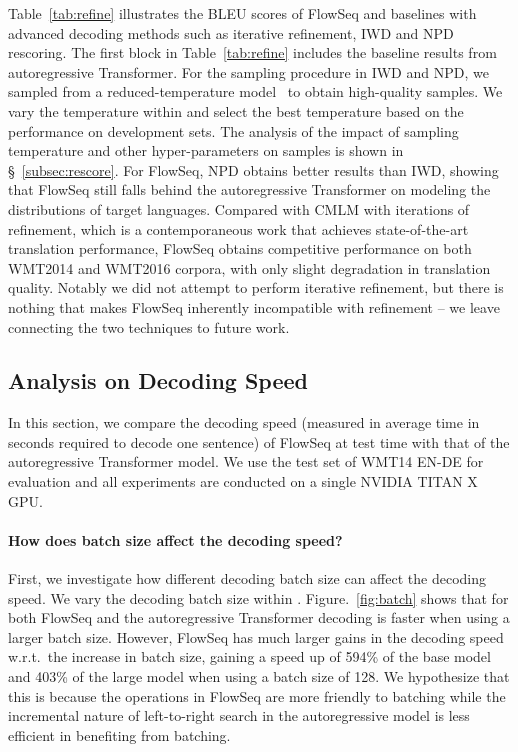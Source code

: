 \documentclass[11pt,a4paper]{article}
\begin{document}
Table~\ref{tab:refine} illustrates the BLEU scores of FlowSeq and baselines with advanced decoding methods such as iterative refinement, IWD and NPD rescoring.
The first block in Table~\ref{tab:refine} includes the baseline results from autoregressive Transformer.
For the sampling procedure in IWD and NPD, we sampled from a reduced-temperature model~\citep{kingma2018glow} to obtain high-quality samples.
We vary the temperature within  and select the best temperature based on the performance on development sets.
The analysis of the impact of sampling temperature and other hyper-parameters on samples is shown in \S~\ref{subsec:rescore}.
For FlowSeq, NPD obtains better results than IWD, showing that FlowSeq still falls behind the autoregressive Transformer on modeling the distributions of target languages.
Compared with CMLM \citep{constant2019} with  iterations of refinement, which is a contemporaneous work that achieves state-of-the-art translation performance, FlowSeq obtains competitive performance on both WMT2014 and WMT2016 corpora, with only slight degradation in translation quality.
Notably we did not attempt to perform iterative refinement, but there is nothing that makes FlowSeq inherently incompatible with refinement -- we leave connecting the two techniques to future work.

\subsection{Analysis on Decoding Speed}
In this section, we compare the decoding speed (measured in average time in seconds required to decode one sentence) of FlowSeq at test time with that of the autoregressive Transformer model. 
We use the test set of WMT14 EN-DE for evaluation and all experiments are conducted on a single NVIDIA TITAN X GPU.
\vspace{-1mm}
\paragraph{How does batch size affect the decoding speed?}
First, we investigate how different decoding batch size can affect the decoding speed. We vary the decoding batch size within . Figure.~\ref{fig:batch} shows that for both FlowSeq and the autoregressive Transformer decoding is faster when using a larger batch size. However, FlowSeq has much larger gains in the decoding speed w.r.t.~the increase in batch size, gaining a speed up of 594\% of the base model and 403\% of the large model when using a batch size of 128. We hypothesize that this is because the operations in FlowSeq are more friendly to batching while the incremental nature of left-to-right search in the autoregressive model is less efficient in benefiting from batching.
\end{document}
